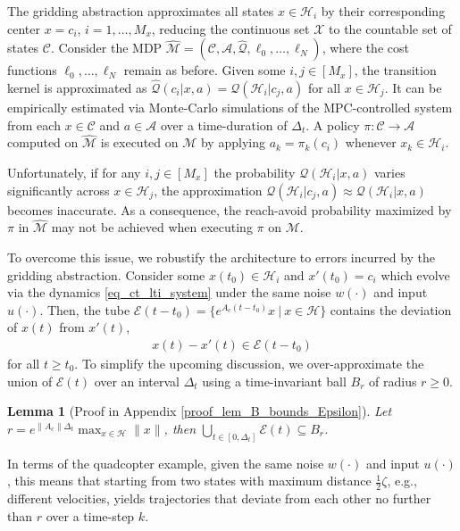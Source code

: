 \documentclass{IEEEtran}
\newtheorem{lemma}[theorem]{Lemma}
\begin{document}
The gridding abstraction approximates all states ${x}\in\mathcal{H}_i$ by their corresponding center ${x}={c}_i$, $i=1,\dots,M_x$, reducing the continuous set $\mathcal{X}$ to the countable set of states $\mathcal{C}$. Consider the MDP $\hat{\mathcal{M}}=(\mathcal{C},\mathcal{A},\hat{\mathcal{Q}},{\ell}_0,\dots,{\ell}_N)$, where the cost functions $\ell_0,\dots,\ell_{N}$ remain as before. Given some $i,j\in[M_x]$, the transition kernel is approximated as $\hat{\mathcal{Q}}({c}_i|x,a)=\mathcal{Q}(\mathcal{H}_i|c_j,a)$ for all $x\in\mathcal{H}_j$. It can be empirically estimated via Monte-Carlo simulations of the MPC-controlled system from each $x\in\mathcal{C}$ and $a\in\mathcal{A}$ over a time-duration of $\Delta_t$. A policy $\pi:\mathcal{C}\rightarrow\mathcal{A}$ computed on $\hat{\mathcal{M}}$ is executed on $\mathcal{M}$ by applying $a_k=\pi_k({c}_i)$ whenever ${x}_k\in\mathcal{H}_i$. 

Unfortunately, if for any $i,j\in[M_x]$ the probability $\mathcal{Q}(\mathcal{H}_i|x,a)$ varies significantly across ${x}\in\mathcal{H}_j$, the approximation ${\mathcal{Q}}(\mathcal{H}_i|{c}_j,a)\approx\mathcal{Q}(\mathcal{H}_i|x,a)$ becomes inaccurate. As a consequence, the reach-avoid probability maximized by $\pi$ in $\hat{\mathcal{M}}$ may not be achieved when executing $\pi$ on $\mathcal{M}$. 

To overcome this issue, we robustify the architecture to errors incurred by the gridding abstraction. Consider some $x(t_0)\in\mathcal{H}_i$ and $x'(t_0)=c_i$ which evolve via the dynamics \eqref{eq_ct_lti_system} under the same noise $w(\cdot)$ and input $u(\cdot)$. Then, the tube $\mathcal{E}(t-t_0)=\{e^{A_c(t-t_0)}x\ | \ x\in\mathcal{H}\}$ contains the deviation of $x(t)$ from $x'(t)$,  
\begin{align}
    \label{eq_tube_bound}
    x(t)-x'(t)\in\mathcal{E}(t-t_0)
\end{align}for all $t\geq t_0$. To simplify the upcoming discussion, we over-approximate the union of $\mathcal{E}(t)$ over an interval $\Delta_t$ using a time-invariant ball $B_r$ of radius $r\geq 0$.
\begin{lemma}[Proof in Appendix \ref{proof_lem_B_bounds_Epsilon}]\label{lem_B_bounds_Epsilon}
    Let $r=e^{\|A_c\|\Delta_t}\max_{{x}\in\mathcal{H}}\|{x}\|$, then $\bigcup_{t\in[0,\Delta_t]}\mathcal{E}(t)\subseteq B_r$. 
\end{lemma}
In terms of the quadcopter example, given the same noise $w(\cdot)$ and input $u(\cdot)$, this means that starting from two states with maximum distance $\frac{1}{2}\zeta$, e.g., different velocities, yields trajectories that deviate from each other no further than $r$ over a time-step $k$.
\end{document}
